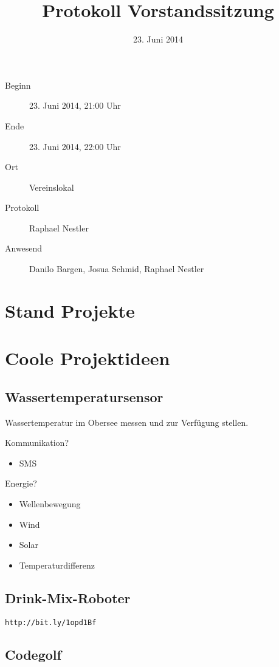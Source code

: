 \documentclass[10pt,a4paper,parskip,fleqn]{scrartcl}
\title{Protokoll Vorstandssitzung}
\date{23. Juni 2014}
\newcommand{\ul}{\begin{itemize}[itemsep=-0.3em,topsep=-0.3em]}
\newcommand{\lu}{\end{itemize}}
\newcommand{\li}{\item}
\begin{document}
\begin{titlepage}

	\maketitle
	\thispagestyle{empty} %

	\vfill

	\begin{description}
		\item[Beginn] 23. Juni 2014, 21:00 Uhr
		\item[Ende] 23. Juni 2014, 22:00 Uhr
		\item[Ort] Vereinslokal
		\item[Protokoll] Raphael Nestler
		\item[Anwesend] Danilo Bargen, Josua Schmid, Raphael Nestler
	\end{description}

\end{titlepage}

\section{Stand Projekte}


\section{Coole Projektideen}

\subsection{Wassertemperatursensor}

Wassertemperatur im Obersee messen und zur Verfügung stellen.

Kommunikation?
\ul
\li	SMS
\lu

Energie?
\ul
\li	Wellenbewegung
\li Wind
\li Solar
\li Temperaturdifferenz
\lu

\subsection{Drink-Mix-Roboter}

\texttt{http://bit.ly/1opd1Bf}


\subsection{Codegolf}
\end{document}
